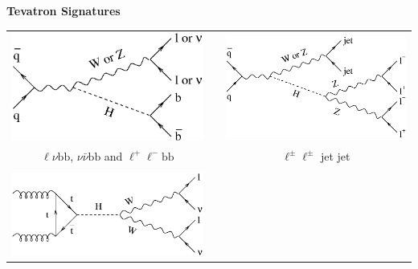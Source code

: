 
\begin{slide*}

\slideframe{}

\begin{center}
  \vfill

  {\bf Tevatron Signatures} \\
  \begin{tabular}[t]{c p{0.25cm} c}
    \includegraphics[scale=0.5]{signature_LA.eps} & &
    \includegraphics[scale=0.5]{signature_HB.eps} \\
    $\ell \nu \mbox{b\={b}}$, $\nu \bar{\nu} \mbox{b\={b}}$ and $\ell^+ \ell^- \mbox{b\={b}}$ & &
    $\ell^\pm \ell^\pm$ jet jet \\
    & \vspace{0.25cm} & \\
    \includegraphics[scale=0.5]{signature_HC.eps} & &

\end{tabular}
\end{center}
\end{slide*}
